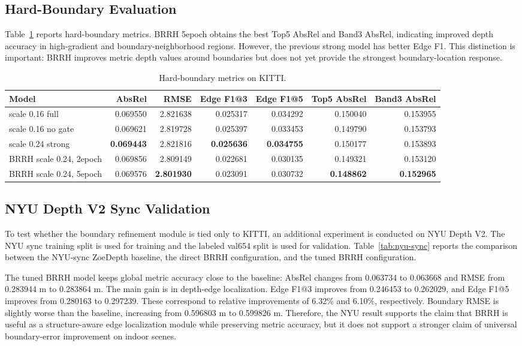 \documentclass{ieeeaccess}
\begin{document}
\subsection{Hard-Boundary Evaluation}

Table~\ref{tab:hard-boundary} reports hard-boundary metrics. BRRH 5epoch obtains the best Top5 AbsRel and Band3 AbsRel, indicating improved depth accuracy in high-gradient and boundary-neighborhood regions. However, the previous strong model has better Edge F1. This distinction is important: BRRH improves metric depth values around boundaries but does not yet provide the strongest boundary-location response.

\begin{table}[t]
\centering
\small
\caption{Hard-boundary metrics on KITTI.}
\label{tab:hard-boundary}
\begin{tabular}{lrrrrrr}
\toprule
Model & AbsRel & RMSE & Edge F1@3 & Edge F1@5 & Top5 AbsRel & Band3 AbsRel \\
\midrule
scale 0.16 full & 0.069550 & 2.821638 & 0.025317 & 0.034292 & 0.150040 & 0.153955 \\
scale 0.16 no gate & 0.069621 & 2.819728 & 0.025397 & 0.033453 & 0.149790 & 0.153793 \\
scale 0.24 strong & \textbf{0.069443} & 2.821816 & \textbf{0.025636} & \textbf{0.034755} & 0.150177 & 0.153893 \\
BRRH scale 0.24, 2epoch & 0.069856 & 2.809149 & 0.022681 & 0.030135 & 0.149321 & 0.153120 \\
BRRH scale 0.24, 5epoch & 0.069576 & \textbf{2.801930} & 0.023091 & 0.030732 & \textbf{0.148862} & \textbf{0.152965} \\
\bottomrule
\end{tabular}
\end{table}

\subsection{NYU Depth V2 Sync Validation}

To test whether the boundary refinement module is tied only to KITTI, an additional experiment is conducted on NYU Depth V2. The NYU sync training split is used for training and the labeled val654 split is used for validation. Table~\ref{tab:nyu-sync} reports the comparison between the NYU-sync ZoeDepth baseline, the direct BRRH configuration, and the tuned BRRH configuration.

The tuned BRRH model keeps global metric accuracy close to the baseline: AbsRel changes from 0.063734 to 0.063668 and RMSE from 0.283944 m to 0.283864 m. The main gain is in depth-edge localization. Edge F1@3 improves from 0.246453 to 0.262029, and Edge F1@5 improves from 0.280163 to 0.297239. These correspond to relative improvements of 6.32\% and 6.10\%, respectively. Boundary RMSE is slightly worse than the baseline, increasing from 0.596803 m to 0.599826 m. Therefore, the NYU result supports the claim that BRRH is useful as a structure-aware edge localization module while preserving metric accuracy, but it does not support a stronger claim of universal boundary-error improvement on indoor scenes.
\end{document}
